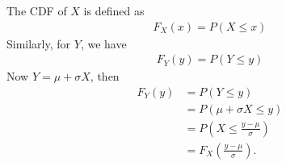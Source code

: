
\setcounter{theorem}{2}
\begin{exercise} [BH.1.3]
\begin{solution}
	The CDF of $X$ is defined as
	\begin{align*}
		F_{X}(x) = P(X\leq x)
	\end{align*}
	Similarly, for $Y$, we have
	\begin{align*}
		F_{Y}(y) = P(Y\leq y)
	\end{align*}
	Now $Y=\mu + \sigma X$, then 
	\begin{align*}
		F_{Y}(y)&=P(Y\leq y)\\
		&=  P(\mu + \sigma X\leq y) \\
		&= P\left(X\leq \frac{y-\mu}{\sigma}\right)\\
		&= F_{X}\left(\frac{y-\mu}{\sigma}\right).
	\end{align*}
\end{solution}
\end{exercise}


